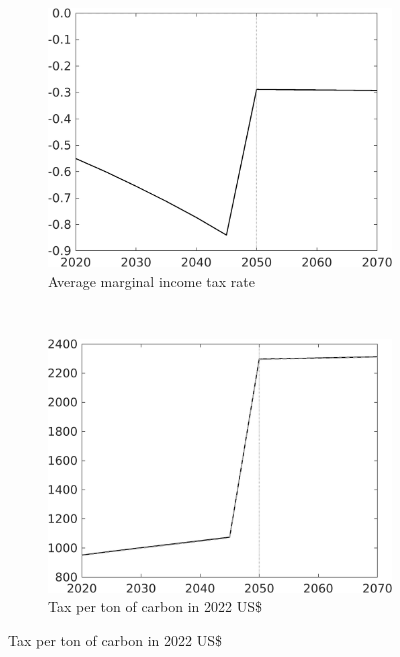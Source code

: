 \begin{figure}[h!!!]
	\centering
	\caption{Optimal policy without knowledge spillovers}\label{fig:opt_TLs_noKN}
	\begin{subfigure}{0.4\textwidth}
		\caption{Average marginal income tax rate }
		\includegraphics[width=1\textwidth]{../../codding_model/own_basedOnFried/optimalPol_010922_revision/figures/all_13Sept22_Tplus30/dTaulAv_OPT_T_NoTaus_COMPtaul_regime4_spillover0_knspil1_noskill0_sep0_xgrowth0_PV1_etaa0.79_lgd0.png}
	\end{subfigure}
	\begin{minipage}[]{0.1\textwidth}
		\
	\end{minipage}
	\begin{subfigure}{0.4\textwidth}
		\caption{Tax per ton of carbon in 2022 US\$}
		\includegraphics[width=1\textwidth]{../../codding_model/own_basedOnFried/optimalPol_010922_revision/figures/all_13Sept22_Tplus30/Tauf_OPT_T_NoTaus_COMPtaul_regime4_spillover0_knspil1_noskill0_sep0_xgrowth0_PV1_etaa0.79_lgd0.png}

\end{subfigure}
\end{figure}
